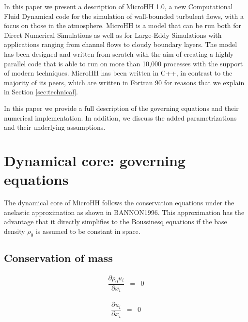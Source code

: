 \documentclass[gmd]{copernicus}
\begin{document}
\introduction  %
In this paper we present a description of MicroHH 1.0, a new Computational Fluid Dynamical code for the simulation of wall-bounded turbulent flows, with a focus on those in the atmosphere. MicroHH is a model that can be run both for Direct Numerical Simulations as well as for Large-Eddy Simulations with applications ranging from channel flows to cloudy boundary layers. The model has been designed and written from scratch with the aim of creating a highly parallel code that is able to run on more than 10,000 processes with the support of modern techniques. MicroHH has been written in C++, in contrast to the majority of its peers, which are written in Fortran 90 for reasons that we explain in Section \ref{sec:technical}.

In this paper we provide a full description of the governing equations and their numerical implementation. In addition, we discuss the added parametrizations and their underlying assumptions.

\section{Dynamical core: governing equations}
The dynamical core of MicroHH follows the conservation equations under the anelastic approximation as shown in BANNON1996. This approximation has the advantage that it directly simplifies to the Boussinesq equations if the base density $\rho_0$ is assumed to be constant in space.

\subsection{Conservation of mass}
\begin{eqnarray}
\dfrac{\partial \rho_0 u_i}{\partial x_i} & = & 0\label{eq:consmassa}
\end{eqnarray}

\begin{eqnarray}
\dfrac{\partial u_i}{\partial x_i} & = & 0\label{eq:consmassb}
\end{eqnarray}
\end{document}
